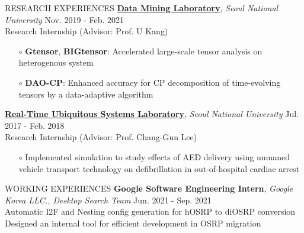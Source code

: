 \documentclass[10pt]{resume} %
\begin{document}
\begin{rSection}{RESEARCH EXPERIENCES}
\href{https://datalab.snu.ac.kr/}{\textbf{Data Mining Laboratory}}, \textit{Seoul National University} \hfill Nov. 2019 - Feb. 2021 \\
Research Internship (Advisor: Prof. U Kang)
\vspace{-1mm}
\begin{itemize}
  \item[$\circ$] \textbf{Gtensor}, \textbf{BIGtensor}: Accelerated large-scale tensor analysis on heterogenous system \vspace{-1mm}
  \item[$\circ$] \textbf{DAO-CP}: Enhanced accuracy for CP decomposition of time-evolving tensors by a data-adaptive algorithm
\end{itemize}
\href{https://rubis.snu.ac.kr/}{\textbf{Real-Time Ubiquitous Systems Laboratory}}, \textit{Seoul National University} \hfill Jul. 2017 - Feb. 2018 \\
Research Internship (Advisor: Prof. Chang-Gun Lee)
\vspace{-1mm}
\begin{itemize}
  \item[$\circ$] Implemented simulation to study effects of AED delivery using unmaned vehicle transport technology on defibrillation in out-of-hospital cardiac arrest
\end{itemize}
\end{rSection}

\begin{rSection}{WORKING EXPERIENCES}
{\bf Google Software Engineering Intern}, \textit{Google Korea LLC., Desktop Search Team} \hfill Jun. 2021 - Sep. 2021 \\ 
Automatic I2F and Nesting config generation for hOSRP to diOSRP conversion \\
Designed an internal tool for efficient development in OSRP migration \\
\end{rSection}
\end{document}
